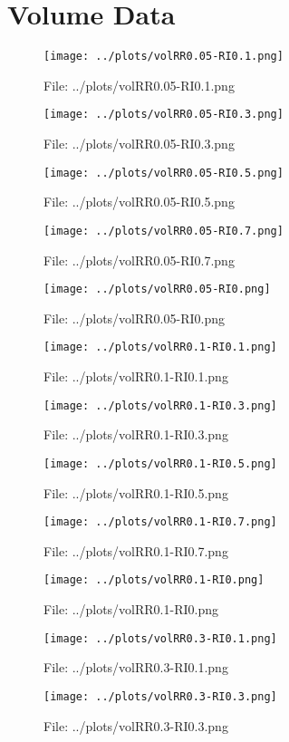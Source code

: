 \documentclass[a4paper, 11pt]{report}
\begin{document}
\section{Volume Data}
\begin{figure}[h] \caption{File: ../plots/volRR0.05-RI0.1.png} \texttt{[image: ../plots/volRR0.05-RI0.1.png]} \end{figure}
\begin{figure}[h] \caption{File: ../plots/volRR0.05-RI0.3.png} \texttt{[image: ../plots/volRR0.05-RI0.3.png]} \end{figure}
\begin{figure}[h] \caption{File: ../plots/volRR0.05-RI0.5.png} \texttt{[image: ../plots/volRR0.05-RI0.5.png]} \end{figure}
\begin{figure}[h] \caption{File: ../plots/volRR0.05-RI0.7.png} \texttt{[image: ../plots/volRR0.05-RI0.7.png]} \end{figure}
\begin{figure}[h] \caption{File: ../plots/volRR0.05-RI0.png} \texttt{[image: ../plots/volRR0.05-RI0.png]} \end{figure}
\begin{figure}[h] \caption{File: ../plots/volRR0.1-RI0.1.png} \texttt{[image: ../plots/volRR0.1-RI0.1.png]} \end{figure}
\begin{figure}[h] \caption{File: ../plots/volRR0.1-RI0.3.png} \texttt{[image: ../plots/volRR0.1-RI0.3.png]} \end{figure}
\begin{figure}[h] \caption{File: ../plots/volRR0.1-RI0.5.png} \texttt{[image: ../plots/volRR0.1-RI0.5.png]} \end{figure}
\begin{figure}[h] \caption{File: ../plots/volRR0.1-RI0.7.png} \texttt{[image: ../plots/volRR0.1-RI0.7.png]} \end{figure}
\begin{figure}[h] \caption{File: ../plots/volRR0.1-RI0.png} \texttt{[image: ../plots/volRR0.1-RI0.png]} \end{figure}
\begin{figure}[h] \caption{File: ../plots/volRR0.3-RI0.1.png} \texttt{[image: ../plots/volRR0.3-RI0.1.png]} \end{figure}
\begin{figure}[h] \caption{File: ../plots/volRR0.3-RI0.3.png} \texttt{[image: ../plots/volRR0.3-RI0.3.png]} \end{figure}
\end{document}
